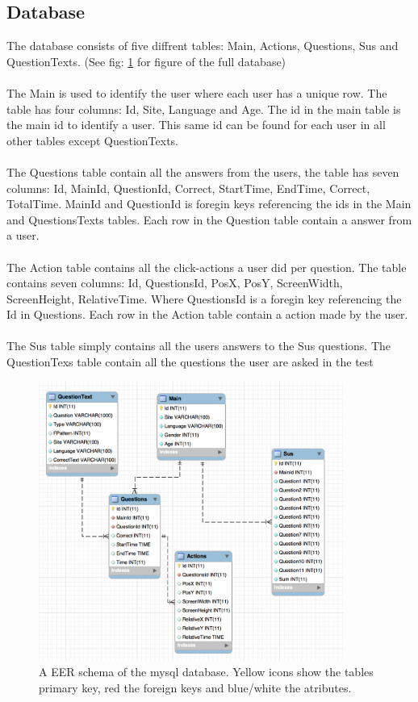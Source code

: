 \subsection{Database}
The database consists of five diffrent tables: Main, Actions, Questions, Sus and QuestionTexts. (See fig: \ref{fig:db_schema} for figure of the full database) 
\\\\
The Main is used to identify the user where each user has a unique row. The table has four columns: Id, Site, Language and Age. The id in the main table is the main id to identify a user. This same id can be found for each user in all other tables except QuestionTexts. 
\\\\
The Questions table contain all the answers from the users, the table has seven columns: Id, MainId, QuestionId, Correct, StartTime, EndTime, Correct, TotalTime. MainId and QuestionId is foregin keys referencing the ids in the Main and QuestionsTexts tables.
Each row in the Question table contain a answer from a user.
\\\\
The Action table contains all the click-actions a user did per question. The table contains seven columns: Id, QuestionsId, PosX, PosY, ScreenWidth, ScreenHeight, RelativeTime. Where QuestionsId is a foregin key referencing the Id in Questions. Each row in the Action table contain a action made by the user.
\\\\
The Sus table simply contains all the users answers to the Sus questions. The QuestionTexs table contain all the questions the user are asked in the test

\begin{figure}[h]
	\centering
	\includegraphics[width=100mm]{Images/db_eer.png}
	\decoRule
	\caption[Database Schema]{A EER schema of the mysql database. Yellow icons show the tables primary key, red the foreign keys and blue/white the atributes.}
	\label{fig:db_schema}
\end{figure}

